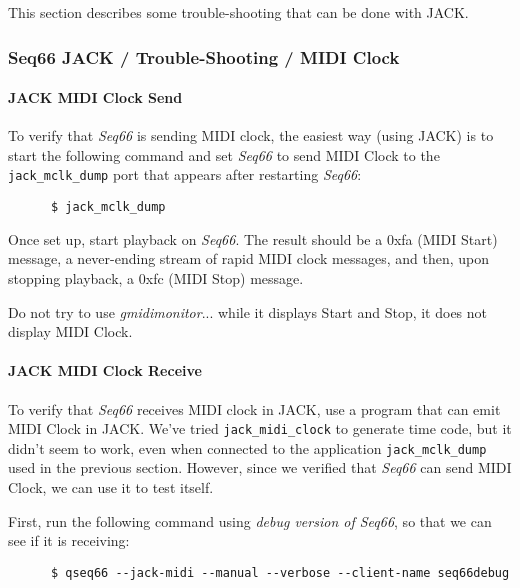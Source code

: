    This section describes some trouble-shooting that can be done with JACK.

\subsubsection{Seq66 JACK / Trouble-Shooting / MIDI Clock}
\label{subsubsec:jack_testing_midi_clock}

\paragraph{JACK MIDI Clock Send}
\label{paragraph:jack_testing_midi_clock_send}

   To verify that \textsl{Seq66} is sending MIDI clock, the easiest way (using
   JACK) is to start the following command and set \textsl{Seq66} to send
   MIDI Clock to the \texttt{jack\_mclk\_dump} port
   that appears after restarting
   \textsl{Seq66}:

   \begin{verbatim}
      $ jack_mclk_dump
   \end{verbatim}

   Once set up, start playback on \textsl{Seq66}.
   The result should be a 0xfa (MIDI Start) message,
   a never-ending stream of rapid MIDI clock messages,
   and then, upon stopping playback, a 0xfc (MIDI Stop) message.

   Do not try to use \textsl{gmidimonitor}... while it displays Start and Stop,
   it does not display MIDI Clock.

\paragraph{JACK MIDI Clock Receive}
\label{paragraph:jack_testing_midi_clock_receive}

   To verify that \textsl{Seq66} receives MIDI clock in JACK, use a program
   that can emit MIDI Clock in JACK.
   We've tried \texttt{jack\_midi\_clock} to generate time code, but
   it didn't seem to work, even when connected to the
   application \texttt{jack\_mclk\_dump} used in the previous section.
   However, since we verified that \textsl{Seq66} can send MIDI Clock, we can
   use it to test itself.

   First, run the following command using \textsl{debug version of Seq66}, so
   that we can see if it is receiving:

   \begin{verbatim}
      $ qseq66 --jack-midi --manual --verbose --client-name seq66debug
   \end{verbatim}

